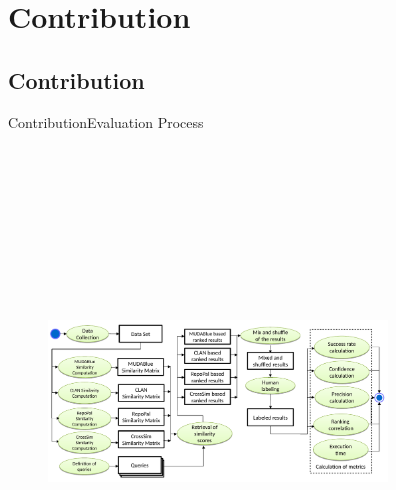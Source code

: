 \documentclass{beamer}
\begin{document}
\section{Contribution}
\subsection{Contribution}

\begin{frame}{Contribution}{Evaluation Process}
	\begin{figure}[!h]
	\includegraphics[width=9cm,height=13.5cm,keepaspectratio]{images/EvaluationProcess.pdf}
	\centering
	\label{fig:EvalProcess}
	\end{figure}
\end{frame}
\end{document}
